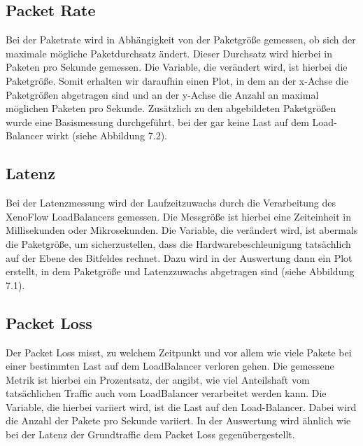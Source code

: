 \subsection{Packet Rate}
Bei der Paketrate wird in Abhängigkeit von der Paketgröße gemessen, ob sich der maximale mögliche Paketdurchsatz ändert. Dieser Durchsatz wird hierbei in Paketen pro Sekunde gemessen. Die Variable, die verändert wird, ist hierbei die Paketgröße. Somit erhalten wir daraufhin einen Plot, in dem an der x-Achse die Paketgrößen abgetragen sind und an der y-Achse die Anzahl an maximal möglichen Paketen pro Sekunde. Zusätzlich zu den abgebildeten Paketgrößen wurde eine Basismessung durchgeführt, bei der gar keine Last auf dem Load-Balancer wirkt (siehe Abbildung 7.2).
\subsection{Latenz}
Bei der Latenzmessung wird der Laufzeitzuwachs durch die Verarbeitung des XenoFlow LoadBalancers gemessen. Die Messgröße ist hierbei eine Zeiteinheit in Millisekunden oder Mikrosekunden. Die Variable, die verändert wird, ist abermals die Paketgröße, um sicherzustellen, dass die Hardwarebeschleunigung tatsächlich auf der Ebene des Bitfeldes rechnet. Dazu wird in der Auswertung dann ein Plot erstellt, in dem Paketgröße und Latenzzuwachs abgetragen sind (siehe Abbildung 7.1).
\subsection{Packet Loss}
Der Packet Loss misst, zu welchem Zeitpunkt und vor allem wie viele Pakete bei einer bestimmten Last auf dem LoadBalancer verloren gehen. Die gemessene Metrik ist hierbei ein Prozentsatz, der angibt, wie viel Anteilshaft vom tatsächlichen Traffic auch vom LoadBalancer verarbeitet werden kann. Die Variable, die hierbei variiert wird, ist die Last auf den Load-Balancer. Dabei wird die Anzahl der Pakete pro Sekunde variiert. In der Auswertung wird ähnlich wie bei der Latenz der Grundtraffic dem Packet Loss gegenübergestellt.
